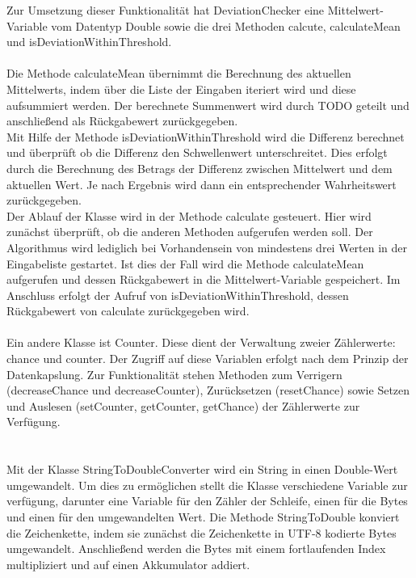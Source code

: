 \documentclass{article}
\begin{document}
    Zur Umsetzung dieser Funktionalität hat DeviationChecker eine Mittelwert-Variable vom Datentyp Double sowie die drei Methoden calcute, calculateMean und isDeviationWithinThreshold.\\
    \\
    Die Methode calculateMean übernimmt die Berechnung des aktuellen Mittelwerts, indem über die Liste der Eingaben iteriert wird und diese aufsummiert werden.
    Der berechnete Summenwert wird durch TODO geteilt und anschließend als Rückgabewert zurückgegeben.\\
    Mit Hilfe der Methode isDeviationWithinThreshold wird die Differenz berechnet und überprüft ob die Differenz den Schwellenwert unterschreitet.
    Dies erfolgt durch die Berechnung des Betrags der Differenz zwischen Mittelwert und dem aktuellen Wert.
    Je nach Ergebnis wird dann ein entsprechender Wahrheitswert zurückgegeben.\\
    Der Ablauf der Klasse wird in der Methode calculate gesteuert. Hier wird zunächst überprüft, ob die anderen Methoden aufgerufen werden soll.
    Der Algorithmus wird lediglich bei Vorhandensein von mindestens drei Werten in der Eingabeliste gestartet.
    Ist dies der Fall wird die Methode calculateMean aufgerufen und dessen Rückgabewert in die Mittelwert-Variable gespeichert.
    Im Anschluss erfolgt der Aufruf von isDeviationWithinThreshold, dessen Rückgabewert von calculate zurückgegeben wird.\\
    \\
    Ein andere Klasse ist Counter.
    Diese dient der Verwaltung zweier Zählerwerte: chance und counter.
    Der Zugriff auf diese Variablen erfolgt nach dem Prinzip der Datenkapslung.
    Zur Funktionalität stehen Methoden zum Verrigern (decreaseChance und decreaseCounter), Zurücksetzen (resetChance) sowie Setzen und Auslesen (setCounter, getCounter, getChance) der Zählerwerte zur Verfügung.\\
    \\
    \\
    Mit der Klasse StringToDoubleConverter wird ein String in einen Double-Wert umgewandelt.
    Um dies zu ermöglichen stellt die Klasse verschiedene Variable zur verfügung, darunter eine Variable für den Zähler der Schleife, einen für die Bytes und einen für den umgewandelten Wert.
    Die Methode StringToDouble konviert die Zeichenkette, indem sie zunächst die Zeichenkette in UTF-8 kodierte Bytes umgewandelt.
    Anschließend werden die Bytes mit einem fortlaufenden Index multipliziert und auf einen Akkumulator addiert.
\end{document}
